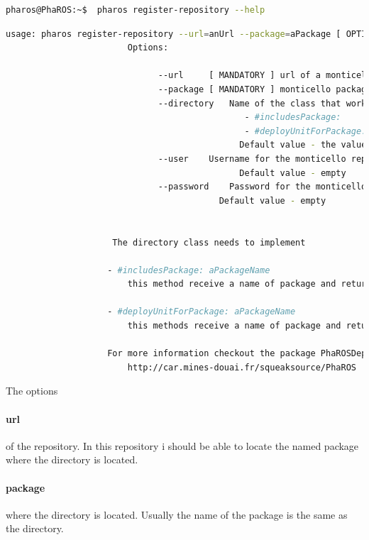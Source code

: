 \documentclass[a4paper,10pt,twoside]{book}
\begin{document}
					
					\begin{lstlisting}[language=bash,title={ Repository registration }]
						pharos@PhaROS:~$  pharos register-repository --help
					\end{lstlisting} 
				
					\begin{lstlisting}[language=bash,title={ Repository creation }]
					usage: pharos register-repository --url=anUrl --package=aPackage [ OPTIONS ]
						Options: 

					          --url		[ MANDATORY ] url of a monticello repository
					          --package	[ MANDATORY ] monticello package name.
					          --directory	Name of the class that works as directory This class must implement  
				                               - #includesPackage: 
				                               - #deployUnitForPackage: 
				                              Default value - the value given for package. 
					          --user	Username for the monticello repository
				                              Default value - empty
					          --password	Password for the monticello repository
			                              Default value - empty
	
	
					 The directory class needs to implement

					- #includesPackage: aPackageName
						this method receive a name of package and return a boolean indicating if package is included by this directory 
	
					- #deployUnitForPackage: aPackageName
						this methods receive a name of package and return a kind of MDPharoDeployUnit. 

					For more information checkout the package PhaROSDeploymentDirectory from the squeaksource repository located at:
						http://car.mines-douai.fr/squeaksource/PhaROS

					\end{lstlisting} 
									
					
					
					The options 
					
					\paragraph{url} of the repository. In this repository i should be able to locate the named package where the directory is located.
					\paragraph{package} where the directory is located. Usually the name of the package is the same as the directory.
\end{document}
